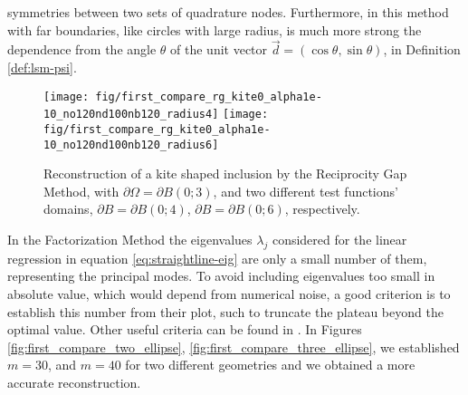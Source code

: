 \documentclass[10pt, a4paper, twoside, openright]{book}
\theoremstyle{definition}
\theoremstyle{plain}
\theoremstyle{plain}
\theoremstyle{plain}
\theoremstyle{plain}
\theoremstyle{plain}
\theoremstyle{plain}
\theoremstyle{plain}
\theoremstyle{plain}
\begin{document}
symmetries between two sets of quadrature nodes.
Furthermore, in this method with far boundaries, like circles with large radius,
is much more strong the dependence from the angle $\theta$ of the unit vector 
$\vec{d}=(\cos\theta, \sin\theta)$, in Definition \ref{def:lsm-psi}.
\begin{center}
\begin{figure}
{
\texttt{[image: fig/first\_compare\_rg\_kite0\_alpha1e-10\_no120nd100nb120\_radius4]}
}
{
\texttt{[image: fig/first\_compare\_rg\_kite0\_alpha1e-10\_no120nd100nb120\_radius6]}
}
\caption{Reconstruction of a kite shaped inclusion by the Reciprocity Gap Method, 
with $\partial\Omega=\partial B(0; 3)$, and two different test functions' domains,
$\partial B=\partial B(0;4)$, $\partial B=\partial B(0;6)$, respectively.}
\label{fig:rg_ellipse}
\end{figure}
\end{center}
\par
In the Factorization Method the eigenvalues $\lambda_j$ considered for the linear regression
in equation \eqref{eq:straightline-eig} are only a small number of them, 
representing the principal modes. 
To avoid including eigenvalues too small in absolute value, 
which would depend from numerical noise, a good criterion
is to establish this number from their plot, such to truncate the plateau beyond the 
optimal value. Other useful criteria can be found in \cite{hanke-bruhl:recent}.
In Figures \ref{fig:first_compare_two_ellipse}, \ref{fig:first_compare_three_ellipse}, 
we established $m=30$, and $m=40$ for two different geometries and we obtained
a more accurate reconstruction.
\end{document}
